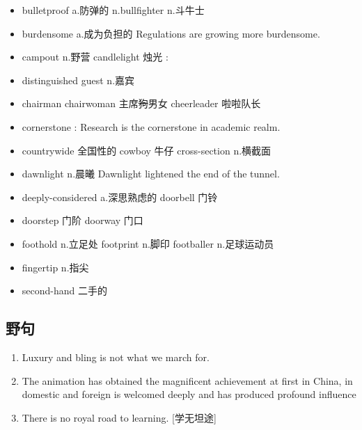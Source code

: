 \documentclass[utf8]{ctexart}
\begin{document}
\begin{itemize}
					\item bulletproof a.防弹的 n.bullfighter n.斗牛士
					\item burdensome a.成为负担的 Regulations are growing more burdensome.
					\item campout n.野营 candlelight 烛光 :
					\item distinguished guest n.嘉宾
					\item chairman chairwoman 主席\sout{狗}男女 cheerleader 啦啦队长
					\item cornerstone : Research is the cornerstone in academic realm.	
					\item countrywide 全国性的 cowboy 牛仔 cross-section n.横截面	
					\item dawnlight n.晨曦 Dawnlight lightened the end of the tunnel.	
					\item deeply-considered a.深思熟虑的 doorbell 门铃
					\item doorstep 门阶 doorway 门口
					\item foothold n.立足处 footprint n.脚印 footballer n.足球运动员
					\item fingertip n.指尖
					\item second-hand 二手的			
							

	

		\end{itemize}
		\subsection{野句}
		\begin{enumerate}
				\item Luxury and bling is not what we march for.
				\item The animation has obtained the magnificent achievement at first in China, in domestic and 
						foreign is welcomed deeply and has produced profound influence
					\item There is no royal road to learning. [学无坦途]
		\end{enumerate}
		
		
\end{document}
